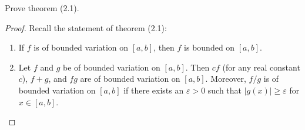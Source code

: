 \begin{problem}
Prove theorem (2.1).
\end{problem}
\begin{proof}
Recall the statement of theorem (2.1):
\begin{theorem*}
\begin{enumerate}[label=(\alph*)]
\item If $f$ is of bounded variation on $[a,b]$, then $f$ is bounded on
  $[a,b]$.
\item Let $f$ and $g$ be of bounded variation on $[a,b]$. Then $cf$ (for
  any real constant $c$), $f+g$, and $fg$ are of bounded variation on
  $[a,b]$. Moreover, $f/g$ is of bounded variation on $[a,b]$ if there
  exists an $\varepsilon>0$ such that $|g(x)|\geq\varepsilon$ for
  $x\in[a,b]$.
\end{enumerate}
\end{theorem*}
\bigskip


\end{proof}

